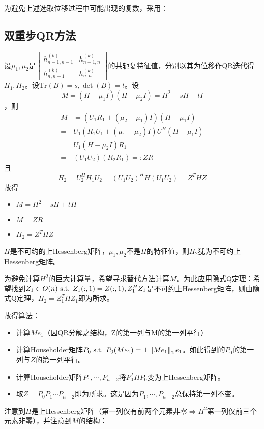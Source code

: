 \documentclass{ctexart}
\begin{document}
为避免上述选取位移过程中可能出现的复数，采用：
\subsection{双重步QR方法}
设$\mu_1,\mu_2$是$\begin{bmatrix}h^{(k)}_{n-1,n-1}&h^{(k)}_{n-1,n}\\h^{(k)}_{n,n-1}&h^{(k)}_{n,n}\end{bmatrix}$的共轭复特征值，分别以其为位移作QR迭代得$H_1,H_2$。设$\mathrm{Tr}(B)=s,\det(B)=t$。设
\[M=(H-\mu_1 I)(H-\mu_2 I)=H^2-sH+tI\]，则
\begin{align*}
M&=(U_1R_1+(\mu_2-\mu_1)I)(H-\mu_1I)\\
=&U_1(R_1U_1+(\mu_1-\mu_2)I)U^H(H-\mu_1 I)\\
=&U_1(H-\mu_2 I)R_1\\
=&(U_1U_2)(R_2R_1)=:ZR
\end{align*}
且
\[H_2=U_2^HH_1U_2=(U_1U_2)^HH(U_1U_2)=Z^THZ\]
故得
\begin{itemize}
\item $M=H^2-sH+tH$
\item $M=ZR$
\item $H_2=Z^THZ$
\end{itemize}

\begin{Thm}
$H$是不可约的上Hessenberg矩阵，$\mu_1,\mu_2$不是$H$的特征值，则$H_2$犹为不可约上Hessenberg矩阵。
\end{Thm}

为避免计算$H^2$的巨大计算量，希望寻求替代方法计算$M$。为此应用隐式Q定理：希望找到$Z_1\in O(n)\text{ s.t. } Z_1(:,1)=Z(:,1),Z_1^HZ_1$是不可约上Hessenberg矩阵，则由隐式Q定理，$H_2=Z_1^THZ_1$即为所求。

故得算法：
\begin{itemize}
\item 计算$Me_1$（因QR分解之结构，Z的第一列与M的第一列平行）
\item 计算Householder矩阵$P_0\text{ s.t. } P_0(Me_1)=\pm\left\|Me_1 \right\|_2 e_1$。如此得到的$P_0$的第一列与$Z$的第一列平行。
\item 计算Householder矩阵$P_1,\cdots,P_{n-2}$将$P_0^THP_0$变为上Hessenberg矩阵。
\item 取$Z=P_0P_1\cdots P_{n-2}$即为所求。这是因为$P_1,\cdots,P_{n-2}$总保持第一列不变。
\end{itemize}

注意到$H$是上Hessenberg矩阵（第一列仅有前两个元素非零$\Rightarrow H^2$第一列仅前三个元素非零），并注意到$M$的结构：
\end{document}
